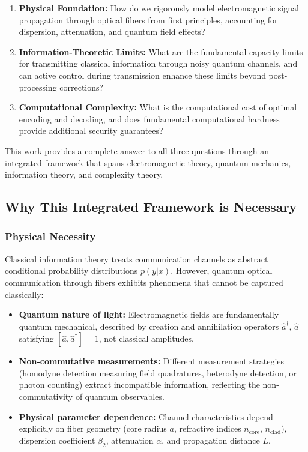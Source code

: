 \documentclass[12pt,a4paper]{article}
\begin{document}
\begin{enumerate}
\item \textbf{Physical Foundation:} How do we rigorously model electromagnetic signal propagation through optical fibers from first principles, accounting for dispersion, attenuation, and quantum field effects?

\item \textbf{Information-Theoretic Limits:} What are the fundamental capacity limits for transmitting classical information through noisy quantum channels, and can active control during transmission enhance these limits beyond post-processing corrections?

\item \textbf{Computational Complexity:} What is the computational cost of optimal encoding and decoding, and does fundamental computational hardness provide additional security guarantees?
\end{enumerate}

This work provides a complete answer to all three questions through an integrated framework that spans electromagnetic theory, quantum mechanics, information theory, and complexity theory.

\subsection{Why This Integrated Framework is Necessary}

\subsubsection{Physical Necessity}

Classical information theory treats communication channels as abstract conditional probability distributions $p(y|x)$. However, quantum optical communication through fibers exhibits phenomena that cannot be captured classically:

\begin{itemize}
\item \textbf{Quantum nature of light:} Electromagnetic fields are fundamentally quantum mechanical, described by creation and annihilation operators $\hat{a}^\dagger$, $\hat{a}$ satisfying $[\hat{a}, \hat{a}^\dagger] = 1$, not classical amplitudes.

\item \textbf{Non-commutative measurements:} Different measurement strategies (homodyne detection measuring field quadratures, heterodyne detection, or photon counting) extract incompatible information, reflecting the non-commutativity of quantum observables.

\item \textbf{Physical parameter dependence:} Channel characteristics depend explicitly on fiber geometry (core radius $a$, refractive indices $n_{\text{core}}$, $n_{\text{clad}}$), dispersion coefficient $\beta_2$, attenuation $\alpha$, and propagation distance $L$.
\end{itemize}
\end{document}

